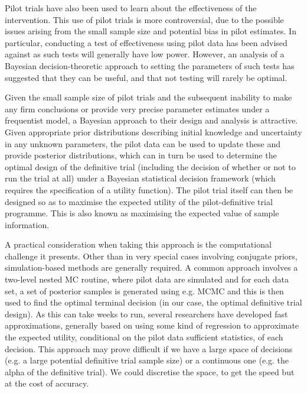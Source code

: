 \documentclass[sagev, Crown]{sagej} %
\begin{document}
Pilot trials have also been used to learn about the effectiveness of the intervention. This use of pilot trials is more controversial, due to the possible issues arising from the small sample size and potential bias in pilot estimates. In particular, conducting a test of effectiveness using pilot data has been advised against as such tests will generally have low power. However, an analysis of a Bayesian decision-theoretic approach to setting the parameters of such tests has suggested that they can be useful, and that not testing will rarely be optimal.
\cite{Cocks2013}
\cite{Lee2012}
\cite{Sim2019}
\cite{Lancaster2004}
\cite{Arain2010}
\cite{Thabane2010}
\cite{Stallard2012}

Given the small sample size of pilot trials and the subsequent inability to make any firm conclusions or provide very precise parameter estimates under a frequentist model, a Bayesian approach to their design and analysis is attractive. Given appropriate prior distributions describing initial knowledge and uncertainty in any unknown parameters, the pilot data can be used to update these and provide posterior distributions, which can in turn be used to determine the optimal design of the definitive trial (including the decision of whether or not to run the trial at all) under a Bayesian statistical decision framework (which requires the specification of a utility function). The pilot trial itself can then be designed so as to maximise the expected utility of the pilot-definitive trial programme. This is also known as maximising the expected value of sample information.
\cite{Lindley1957}
\cite{Gittins2000}
\cite{Gittins2000a}
\cite{Gittins2002}
\cite{Halpern2001}
\cite{Willan2005}
\cite{Turner2004}
\cite{Spiegelhalter2001}

A practical consideration when taking this approach is the computational challenge it presents. Other than in very special cases involving conjugate priors, simulation-based methods are generally required. A common approach involves a two-level nested MC routine, where pilot data are simulated and for each data set, a set of posterior samples is generated using e.g. MCMC and this is then used to find the optimal terminal decision (in our case, the optimal definitive trial design). As this can take weeks to run, several researchers have developed fast approximations, generally based on using some kind of regression to approximate the expected utility, conditional on the pilot data sufficient statistics, of each decision. This approach may prove difficult if we have a large space of decisions (e.g. a large potential definitive trial sample size) or a continuous one (e.g. the alpha of the definitive trial). We could discretise the space, to get the speed but at the cost of accuracy.
\cite{Strong2014}
\cite{Strong2015}
\cite{Menzies2015}
\cite{Heath2017}
\cite{Jalal2017}
\cite{Heath2019}
\end{document}
